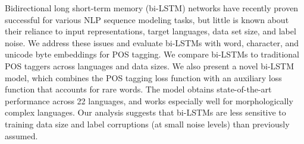 Bidirectional long short-term memory (bi-LSTM) networks have recently proven successful for various NLP sequence modeling tasks, but little is known about their reliance to input representations, target languages, data set size, and label noise. We address these issues and evaluate bi-LSTMs with word, character, and unicode byte embeddings for POS tagging. We compare bi-LSTMs to traditional POS taggers across languages and data sizes. We also present a novel bi-LSTM model, which combines the POS tagging loss function with an auxiliary loss function that accounts for rare words. The model obtains state-of-the-art performance across 22 languages, and works especially well for morphologically complex languages. Our analysis suggests that bi-LSTMs are less sensitive to training data size and label corruptions (at small noise levels) than previously assumed.
